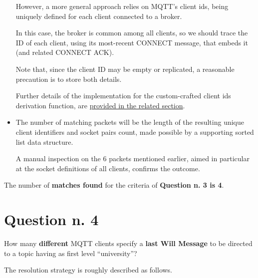 \documentclass[a4paper,11pt]{article} %
\begin{document}
\begin{itemize}
        \label{description-clientids}
        However, a more general approach relies on MQTT's client ids, being uniquely defined for each client connected to a broker.

        In this case, the broker is common among all clients, so we should trace the ID of each client, using its most-recent \textsc{CONNECT} message, that embeds it (and related \textsc{CONNECT ACK}).

        Note that, since the client ID may be empty or replicated, a reasonable precaution is to store both details.

        Further details of the implementation for the custom-crafted client ids derivation function, are \hyperref[subsubsec:mqtt-clientid-python]{provided in the related section}.
        \item The number of matching packets will be the length of the resulting unique client identifiers and socket pairs count, made possible by a supporting sorted list data structure.

        A manual inspection on the 6 packets mentioned earlier, aimed in particular at the socket definitions of all clients, confirms the outcome.
    \end{itemize}

    The number of \textbf{matches found} for the criteria of \textbf{Question n. 3 is 4}.


    \section{Question n. 4}\label{sec:question-n.-4}

    How many \textbf{different} MQTT clients specify a \textbf{last Will Message} to be directed to a topic having as first level “university”?

    \medskip

    The resolution strategy is roughly described as follows.
\end{document}
